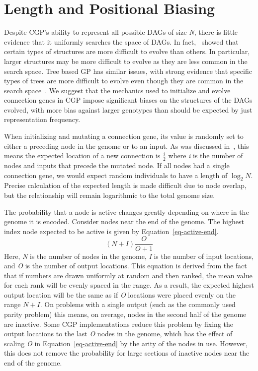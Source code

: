 \documentclass{sig-alternate}
\begin{document}
\section{Length and Positional Biasing}
\label{sec-length-biasing}
Despite CGP's ability to represent all possible DAGs
of size \emph{N}, there is little evidence that it uniformly
searches the space of DAGs. In fact,~\cite{payne:2009:bias} showed that certain types of structures
are more difficult to evolve than others.  In particular, larger structures may be more difficult to
evolve as they are less common in the search space. 
Tree based GP has similar issues,
with strong evidence that specific types of trees are more difficult to
evolve even though they are common in the search space~\cite{daida3:2003:treebias}.
We suggest that
the mechanics used to initialize and evolve connection genes in CGP
impose significant biases on the structures of the DAGs evolved, with more bias against
larger genotypes than should be expected by just representation frequency.

When initializing and mutating a connection gene, its value is randomly set to
either a preceding node in the genome or to an input.  As was discussed in~\cite{collins:2006:haystacks},
this means the expected location of a new connection is $\frac{i}{2}$ where \emph{i}
is the number of nodes and inputs that precede the mutated node.  If all nodes had
a single connection gene, we would expect random individuals to have a length of $\log_2N$.
Precise calculation of the expected length is made difficult
due to node overlap, but the relationship will remain logarithmic to the total genome size.

The probability that a node is active changes greatly depending on where
in the genome it is encoded.  Consider nodes near the end of the genome.
The highest index node expected to be active is given by Equation~\ref{eq-active-end}.
\begin{equation}
  \left ( N+I \right )\frac{O}{O + 1}
  \label{eq-active-end}
\end{equation}
Here, \emph{N} is the number of nodes in the genome, \emph{I} is the number of input locations,
and \emph{O} is the number of output locations.  This equation is derived from the fact that
if numbers are drawn uniformly at random and then ranked, the mean value for each rank
will be evenly spaced in the range.  As a result, the expected highest output location will be
the same as if \emph{O} locations were placed evenly on the range $N + I$.
On problems with a single
output (such as the commonly used parity problem) this means, on average, nodes
in the second half of the genome are inactive.  
Some CGP implementations reduce this problem by
fixing the output locations to the last \emph{O} nodes in the genome, which has the effect
of scaling \emph{O} in Equation~\ref{eq-active-end} by the arity of the nodes in use.  However, this does not
remove the probability for large sections of inactive nodes near the end of the genome.
\end{document}
